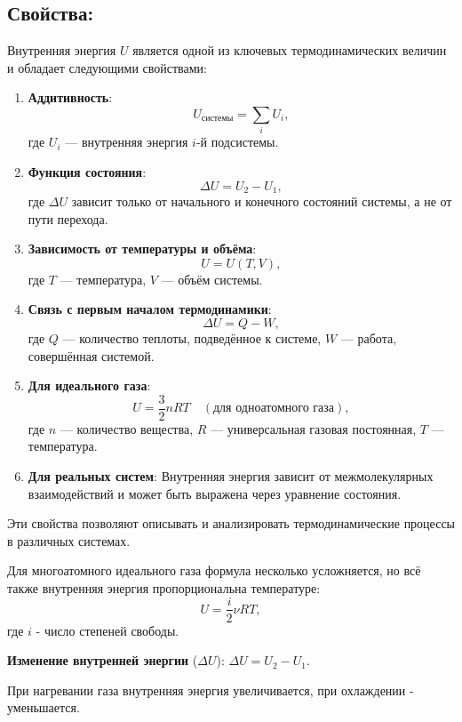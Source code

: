 \documentclass[a4paper,12pt]{article}
\begin{document}
\subsection*{Свойства:}
\vspace{-3pt}
Внутренняя энергия $U$ является одной из ключевых термодинамических величин и обладает следующими свойствами:
\begin{enumerate} [itemsep=0pt, topsep=0pt, parsep=0pt]
    \item \textbf{Аддитивность}:
        $$ U_{\text{системы}} = \sum_{i} U_{i}, $$
        где $U_{i}$ — внутренняя энергия $i$-й подсистемы.
    \item \textbf{Функция состояния}:
        $$\Delta U = U_{2} - U_{1},$$
        где $\Delta U$ зависит только от начального и конечного состояний системы, а не от пути перехода.
    \item \textbf{Зависимость от температуры и объёма}:
        $$U = U(T, V),$$
        где $T$ — температура, $V$ — объём системы.
    \item \textbf{Связь с первым началом термодинамики}:
        $$\Delta U = Q - W,$$
        где $Q$ — количество теплоты, подведённое к системе, $W$ — работа, совершённая системой.
    \item \textbf{Для идеального газа}:
        $$U = \frac{3}{2} nRT \quad (\text{для одноатомного газа}),$$
        где $n$ — количество вещества, $R$ — универсальная газовая постоянная, $T$ — температура.
    \item \textbf{Для реальных систем}:
        Внутренняя энергия зависит от межмолекулярных взаимодействий и может быть выражена через уравнение состояния.
\end{enumerate}
\vspace{5pt}
\par
Эти свойства позволяют описывать и анализировать термодинамические процессы в различных системах.
\par
Для многоатомного идеального газа формула несколько усложняется, но всё также внутренняя энергия пропорциональна температуре: $$U = \frac{i}{2}\nu RT,$$ где $i$ - число степеней свободы.
\par
\textbf{Изменение внутренней энергии} ($\Delta U$): $\Delta U = U_2 - U_1$.
\par
При нагревании газа внутренняя энергия увеличивается, при охлаждении - уменьшается.


\newpage
\end{document}
